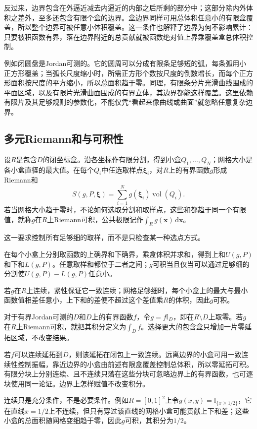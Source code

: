 反过来，边界包含在外逼近减去内逼近的内部之后所剩的部分中；这部分除内外体积之差外，至多还包含有限个盒的边界。盒边界同样可用总体积任意小的有限盒覆盖，所以整个边界可被任意小体积覆盖。这一条件也解释了边界为何不影响累计：只要被积函数有界，落在边界附近的总贡献就被函数绝对值上界乘覆盖盒总体积控制。

例如闭圆盘是Jordan可测的。它的圆周可以分成有限条足够短的弧，每条弧用小正方形覆盖；当弧长尺度缩小时，所需正方形个数按尺度的倒数增长，而每个正方形面积按尺度的平方缩小，所以总面积趋于零。同理，有限条分片光滑曲线围成的平面区域，以及有限片光滑曲面围成的有界立体，其边界都能这样覆盖。这里依赖有限片及其足够规则的参数化，不能仅凭“看起来像曲线或曲面”就忽略任意复杂边界。

\subsection{多元Riemann和与可积性}

设$R$是包含$D$的闭坐标盒。沿各坐标作有限分割，得到小盒$Q_1,\ldots,Q_N$；网格大小是各小盒直径的最大值。在每个$Q_i$中任选取样点$\bm\xi_i$，对$R$上的有界函数$g$形成Riemann和
\[
 S(g,P,\bm\xi)=\sum_{i=1}^N g(\bm\xi_i)\operatorname{vol}(Q_i).
\]
若当网格大小趋于零时，不论如何选取分割和取样点，这些和都趋于同一个有限值，就称$g$在$R$上Riemann可积，公共极限记作$\int_R g(\bm x)\,\mathrm d\bm x$。

这一要求控制所有足够细的取样，而不是只检查某一种选点方式。

在每个小盒上分别取函数的上确界和下确界，乘盒体积并求和，得到上和$U(g,P)$和下和$L(g,P)$。任意取样和都位于二者之间；$g$可积当且仅当可以通过足够细的分割使$U(g,P)-L(g,P)$任意小。

若$g$在$R$上连续，紧性保证它一致连续；网格足够细时，每个小盒上的最大与最小函数值相差任意小，上下和的差便不超过这个差值乘$R$的体积，因此$g$可积。

对于有界Jordan可测的$D$和$D$上的有界函数$f$，令$g=f\mathbb I_D$，即在$R\setminus D$上取零。若$g$在$R$上Riemann可积，就把其积分定义为$\int_D f$。选择更大的包含盒只增加一片零延拓区域，不改变结果。

若$f$可以连续延拓到$\overline D$，则该延拓在闭包上一致连续。远离边界的小盒可用一致连续性控制振幅，靠近边界的小盒由前述有限盒覆盖控制总体积，所以零延拓可积。有限分块上分别连续、且不连续只落在这些分块可忽略边界上的有界函数，也可逐块使用同一论证。边界上怎样赋值不改变积分。

连续只是充分条件，不是必要条件。例如$R=[0,1]^2$上令$g(x,y)=\mathbb I_{\{x\geq1/2\}}$，它在直线$x=1/2$上不连续，但只有穿过该直线的网格小盒可能贡献上下和差；这些小盒的总面积随网格变细趋于零，因此$g$可积，其积分为$1/2$。

